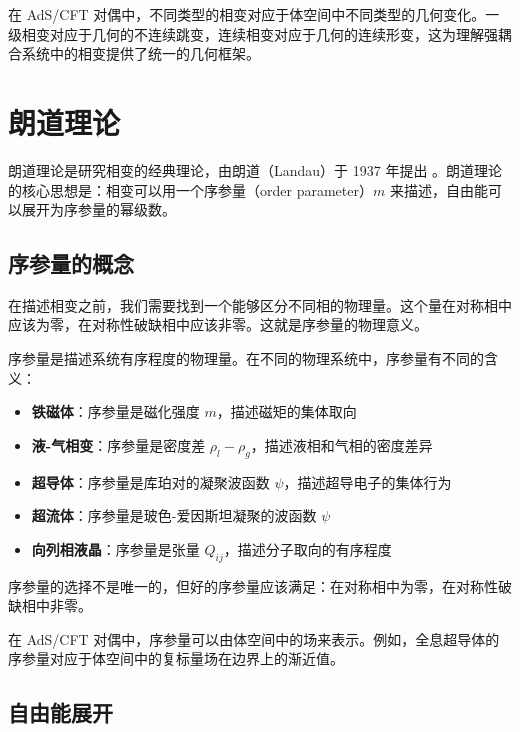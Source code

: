 在 AdS/CFT 对偶中，不同类型的相变对应于体空间中不同类型的几何变化。一级相变对应于几何的不连续跳变，连续相变对应于几何的连续形变，这为理解强耦合系统中的相变提供了统一的几何框架。

\section{朗道理论}

朗道理论是研究相变的经典理论，由朗道（Landau）于 1937 年提出 \cite{Landau1937}。朗道理论的核心思想是：相变可以用一个序参量（order parameter）$m$ 来描述，自由能可以展开为序参量的幂级数。

\subsection{序参量的概念}

\begin{note}
在描述相变之前，我们需要找到一个能够区分不同相的物理量。这个量在对称相中应该为零，在对称性破缺相中应该非零。这就是序参量的物理意义。
\end{note}

\begin{definition}[序参量]
序参量是描述系统有序程度的物理量。在不同的物理系统中，序参量有不同的含义：
\begin{itemize}
    \item \textbf{铁磁体}：序参量是磁化强度 $m$，描述磁矩的集体取向
    \item \textbf{液-气相变}：序参量是密度差 $\rho_l - \rho_g$，描述液相和气相的密度差异
    \item \textbf{超导体}：序参量是库珀对的凝聚波函数 $\psi$，描述超导电子的集体行为
    \item \textbf{超流体}：序参量是玻色-爱因斯坦凝聚的波函数 $\psi$
    \item \textbf{向列相液晶}：序参量是张量 $Q_{ij}$，描述分子取向的有序程度
\end{itemize}
序参量的选择不是唯一的，但好的序参量应该满足：在对称相中为零，在对称性破缺相中非零。
\end{definition}

\begin{remark}
在 AdS/CFT 对偶中，序参量可以由体空间中的场来表示。例如，全息超导体的序参量对应于体空间中的复标量场在边界上的渐近值。
\end{remark}

\subsection{自由能展开}

